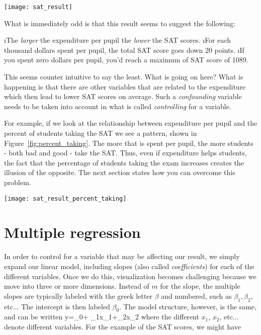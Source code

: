 \begin{figure*}
\texttt{[image: sat\_result]}
\caption{Total SAT score vs expenditure (top) and the distributions for the slope (bottom left) and intercept (bottom right).}\label{fig:sat}
\end{figure*}

What is immediately odd is that this result seems to suggest the following:

\be
\i The \emph{larger} the expenditure per pupil the \emph{lower} the SAT scores.
\i For each thousand dollars spent per pupil, the total SAT score goes down 20 points.
\i If you spent zero dollars per pupil, you'd reach a maximum of SAT score of 1089.
\ee

This seems counter intuitive to say the least.  What is going on here?   What is happening is that there are other variables that are related to the expenditure which then lead to lower SAT scores on average.  Such a \emph{confounding} variable needs to be taken into account in what is called \emph{controlling} for a variable.

For example, if we look at the relationship between expenditure per pupil and the percent of students taking the SAT we see a pattern, shown in Figure~\ref{fig:percent_taking}.  The more that is spent per pupil, the more students - both bad and good - take the SAT.  Thus, even if expenditure helps students, the fact that the percentage of students taking the exam increases creates the illusion of the opposite. The next section states how you can overcome this problem.


\begin{figure*}
\texttt{[image: sat\_result\_percent\_taking]}
\caption{Percent of Students Taking the SAT vs per pupil expenditure (top) and the distributions for the slope (bottom left) and intercept (bottom right).}\label{fig:percent_taking}
\end{figure*}


\section{Multiple regression}

In order to control for a variable that may be affecting our result, we simply expand our linear model, including slopes (also called \emph{coefficients}) for each of the different variables.  Once we do this, visualization becomes challenging because we move into three or more dimensions.   Instead of $m$ for the slope, the multiple slopes are typically labeled with the greek letter $\beta$ and numbered, such as $\beta_{1}, \beta_{2},$ etc...  The intercept is then labeled $\beta_{0}$.  The model structure, however, is the same, and can be written
\beqn
y=\beta_{0}+ \beta_{1}x_{1}+\beta_{2}x_{2} \cdots
\eeqn
where the different $x_{1}$, $x_{2}$, etc... denote different variables.  For the example of the SAT scores, we might have

